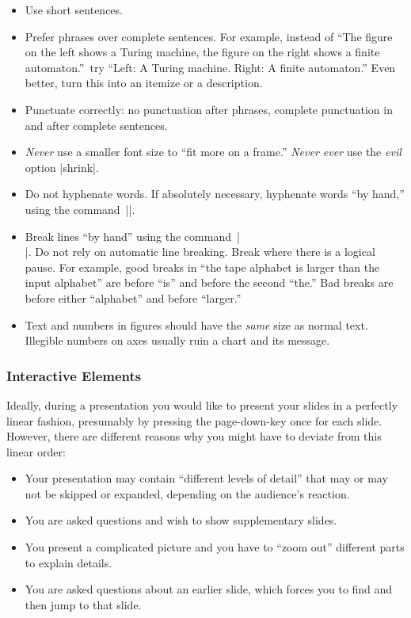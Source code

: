\begin{itemize}
\item
  Use short sentences.
\item
  Prefer phrases over complete sentences. For example, instead of ``The figure on the left shows a Turing machine, the figure on the right shows a finite automaton.''\ try ``Left: A Turing machine. Right: A finite automaton.'' Even better, turn this into an itemize or a description.
\item
  Punctuate correctly: no punctuation after phrases, complete punctuation in and after complete sentences.
\item
  \emph{Never} use a smaller font size to ``fit more on a frame.'' \emph{Never ever} use the \emph{evil} option |shrink|.
\item
  Do not hyphenate words. If absolutely necessary, hyphenate words ``by hand,'' using the command~|\-|.
\item
  Break lines ``by hand'' using the command~|\\|. Do not rely on automatic line breaking. Break where there is a logical pause. For example, good breaks in ``the tape alphabet is larger than the input alphabet'' are before ``is'' and before the second ``the.'' Bad breaks are before either ``alphabet'' and before ``larger.''
\item
  Text and numbers in figures should have the \emph{same} size as normal text. Illegible numbers on axes usually ruin a chart and its message.
\end{itemize}

\subsubsection{Interactive Elements}

Ideally, during a presentation you would like to present your slides in a perfectly linear fashion, presumably by pressing the page-down-key once for each slide. However, there are different reasons why you might have to deviate from this linear order:
\begin{itemize}
\item
  Your presentation may contain ``different levels of detail'' that may or may not be skipped or expanded, depending on the audience's reaction.
\item
  You are asked questions and wish to show supplementary slides.
\item
  You present a complicated picture and you have to ``zoom out'' different parts to explain details.
\item
  You are asked questions about an earlier slide, which forces you to find and then jump to that slide.
\end{itemize}

